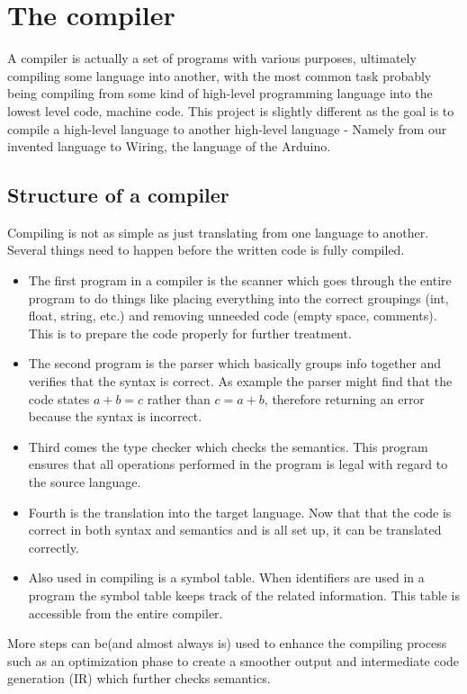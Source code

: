 \section{The compiler}
A compiler is actually a set of programs with various purposes, ultimately compiling some language into another, with the most common task probably being compiling from some kind of high-level programming language into the lowest level code, machine code. This project is slightly different as the goal is to compile a high-level language to another high-level language - Namely from our invented language to Wiring, the language of the Arduino.
\subsection{Structure of a compiler}
Compiling is not as simple as just translating from one language to another. Several things need to happen before the written code is fully compiled.\cite{compiler:structure}\\

\begin{itemize}
	\item The first program in a compiler is the scanner which goes through the entire program to do things like placing everything into the correct groupings (int, float, string, etc.) and removing unneeded code (empty space, comments). This is to prepare the code properly for further treatment.
	\item The second program is the parser which basically groups info together and verifies that the syntax is correct. As example the parser might find that the code states $a + b = c$ rather than $c = a + b$, therefore returning an error because the syntax is incorrect.

	\item Third comes the type checker which checks the semantics. This program ensures that all operations performed in the program is legal with regard to the source language.

	\item Fourth is the translation into the target language. Now that that the code is correct in both syntax and semantics and is all set up, it can be translated correctly.

	\item Also used in compiling is a symbol table. When identifiers are used in a program the symbol table keeps track of the related information. This table is accessible from the entire compiler.
\end{itemize}

More steps can be(and almost always is) used to enhance the compiling process such as an optimization phase to create a smoother output and intermediate code generation (IR) which further checks semantics.